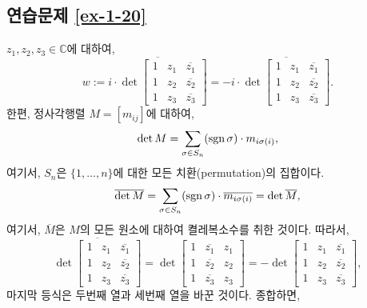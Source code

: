 \subsection*{연습문제 \ref{ex-1-20}}

$z_1, z_2, z_3 \in\mathbb C$에 대하여,
\[
w:= \overline{i\cdot \det \begin{bmatrix}
1 & z_1 & \overline{z_1} \\
1 & z_2 & \overline{z_2} \\
1 & z_3 & \overline{z_3}
\end{bmatrix}}
= -i\cdot \overline{\det \begin{bmatrix}
1 & z_1 & \overline{z_1} \\
1 & z_2 & \overline{z_2} \\
1 & z_3 & \overline{z_3}
\end{bmatrix}}.
\]
한편, 정사각행렬 $M=[m_{ij}]$에 대하여,
\[
\det M = \sum_{\sigma\in S_n} (\mathop{\mathrm{sgn}} \sigma) \cdot m_{i\sigma(i)},
\]
여기서, $S_n$은 $\{1,\ldots, n\}$에 대한 모든 치환(permutation)의 집합이다.
\[
\overline{\det M} = \sum_{\sigma\in S_n} (\mathop{\mathrm{sgn}} \sigma) \cdot
\overline{m_{i\sigma(i)}} = \det \overline{M},
\]
여기서, $\overline{M}$은 $M$의 모든 원소에 대하여 켤레복소수를 취한 것이다.
따라서,
\[
\overline{\det \begin{bmatrix}
1 & z_1 & \overline{z_1} \\
1 & z_2 & \overline{z_2} \\
1 & z_3 & \overline{z_3}
\end{bmatrix}}
= \det \begin{bmatrix}
1 & \overline{z_1} & z_1 \\
1 & \overline{z_2} & z_2 \\
1 & \overline{z_3} & z_3
\end{bmatrix}
= -  \det \begin{bmatrix}
1 & z_1 & \overline{z_1} \\
1 & z_2 & \overline{z_2} \\
1 & z_3 & \overline{z_3}
\end{bmatrix},
\]
마지막 등식은 두번째 열과 세번째 열을 바꾼 것이다.
종합하면,
